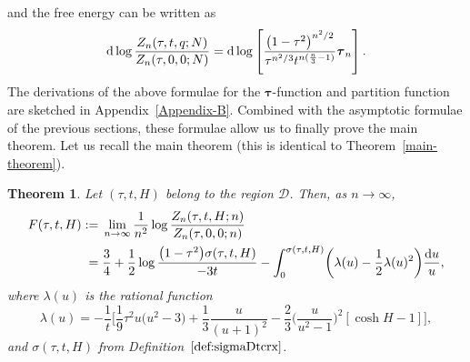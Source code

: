 \documentclass[10pt,a4paper]{amsart}
\numberwithin{equation}{section}
\newtheorem*{Theorem*}{Theorem}
\begin{document}
 and the free energy can be written as
 \begin{equation*}
 {\rm d}\log \frac{Z_{n}(\tau,t,q;N)}{Z_{n}(\tau,0,0;N)} = {\rm d}\log \left[\frac{\bigl(1-\tau^2\bigr)^{n^2/2}}{\tau^{n^2/3}t^{n(\frac{n}{3}-1)}}\boldsymbol{\tau}_n\right].
 \end{equation*}
The derivations of the above formulae for the $\boldsymbol{\tau}$-function and partition function are sketched in Appendix~\ref{Appendix-B}. Combined with the asymptotic formulae of the previous sections, these formulae allow us to finally prove the main theorem. Let us recall the main theorem (this is identical to Theorem~\ref{main-theorem}).

\begin{Theorem*}
 Let $(\tau,t,H)$ belong to the region $\mathcal D$. Then, as $n\to \infty$,
 \begin{align*}
 F(\tau,t,H):={}&\lim_{n\to \infty} \frac{1}{n^2}\log \frac{ Z_{n}(\tau,t,H;n) }{ Z_{n}(\tau,0,0;n)} \\
={}& \frac{3}{4} + \frac{1}{2}\log \frac{\bigl(1-\tau^2\bigr)\sigma(\tau,t,H)}{-3t} - \int_{0}^{\sigma(\tau,t,H)}\biggl(\lambda(u)-\frac{1}{2}\lambda(u)^2\biggr) \frac{{\rm d}u}{u},
\end{align*}
 where $\lambda(u)$ is the rational function
 \begin{equation*}
 \lambda(u) = -\frac{1}{t}\biggl[\frac{1}{9}\tau^2u\bigl(u^2-3\bigr) + \frac{1}{3}\frac{u}{(u+1)^2} - \frac{2}{3}\biggl(\frac{u}{u^2-1}\biggr)^2[\cosh H -1]\biggr],
 \end{equation*}
 and $\sigma(\tau,t,H)$ from Definition~$\ref{def:sigmaDtcrx}$.
 \end{Theorem*}
\end{document}
